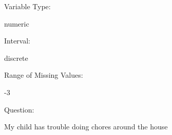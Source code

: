 \documentclass[
]{article}
\begin{document}
\begin{minipage}[t]{0.3\linewidth}

Variable Type:

\end{minipage}%
\begin{minipage}[t]{0.7\linewidth}

numeric

\end{minipage}

\begin{minipage}[t]{0.3\linewidth}

Interval:

\end{minipage}%
\begin{minipage}[t]{0.7\linewidth}

discrete

\end{minipage}

\begin{minipage}[t]{0.3\linewidth}

Range of Missing Values:

\end{minipage}%
\begin{minipage}[t]{0.7\linewidth}

-3

\end{minipage}

\begin{minipage}[t]{0.3\linewidth}

Question:

\end{minipage}%
\begin{minipage}[t]{0.7\linewidth}

My child has trouble doing chores around the house

\end{minipage}
\end{document}
